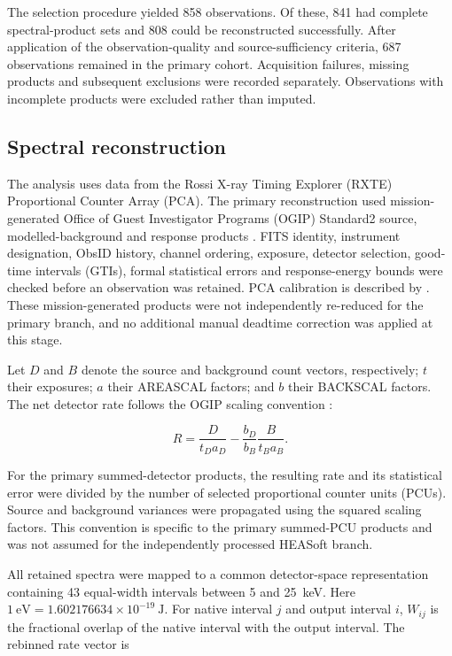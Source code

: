 \documentclass[final,5p,authoryear,nopreprintline]{elsarticle}
\begin{document}
The selection procedure yielded 858 observations. Of these, 841 had complete spectral-product sets and 808 could be reconstructed successfully. After application of the observation-quality and source-sufficiency criteria, 687 observations remained in the primary cohort. Acquisition failures, missing products and subsequent exclusions were recorded separately. Observations with incomplete products were excluded rather than imputed.

\subsection{Spectral reconstruction}

The analysis uses data from the Rossi X-ray Timing Explorer (RXTE) Proportional Counter Array (PCA). The primary reconstruction used mission-generated Office of Guest Investigator Programs (OGIP) Standard2 source, modelled-background and response products \citep{NASAStandard}. FITS identity, instrument designation, ObsID history, channel ordering, exposure, detector selection, good-time intervals (GTIs), formal statistical errors and response-energy bounds were checked before an observation was retained. PCA calibration is described by \citet{Jahoda2006}. These mission-generated products were not independently re-reduced for the primary branch, and no additional manual deadtime correction was applied at this stage.

Let $D$ and $B$ denote the source and background count vectors, respectively; $t$ their exposures; $a$ their AREASCAL factors; and $b$ their BACKSCAL factors. The net detector rate follows the OGIP scaling convention \citep{XSPECSpectra}:

\begin{equation}
\label{eq:net-rate}
R =
\frac{D}{t_D a_D}
-
\frac{b_D}{b_B}
\frac{B}{t_B a_B}.
\end{equation}

For the primary summed-detector products, the resulting rate and its statistical error were divided by the number of selected proportional counter units (PCUs). Source and background variances were propagated using the squared scaling factors. This convention is specific to the primary summed-PCU products and was not assumed for the independently processed HEASoft branch.

All retained spectra were mapped to a common detector-space representation containing 43 equal-width intervals between 5 and 25~keV. Here $1~\mathrm{eV}=1.602176634\times10^{-19}~\mathrm{J}$. For native interval $j$ and output interval $i$, $W_{ij}$ is the fractional overlap of the native interval with the output interval. The rebinned rate vector is
\end{document}
